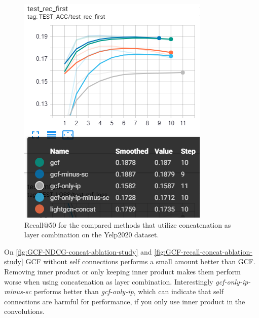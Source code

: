 \begin{figure}[h!]
    \includegraphics[width=\linewidth]{figures/gcf-concat-recall.png}
    \caption{Recall@50 for the compared methods that utilize concatenation as layer combination on the Yelp2020 dataset.}
    \label{fig:GCF-recall-concat-ablation-study}
\end{figure}
On \autoref{fig:GCF-NDCG-concat-ablation-study} and \autoref{fig:GCF-recall-concat-ablation-study} GCF without self connections performs a small amount better than GCF.
Removing inner product or only keeping inner product makes them perform worse when using concatenation as layer combination.
Interestingly \textit{gcf-only-ip-minus-sc} performs better than \textit{gcf-only-ip}, which can indicate that self connections are harmful for performance, if you only use inner product in the convolutions.
